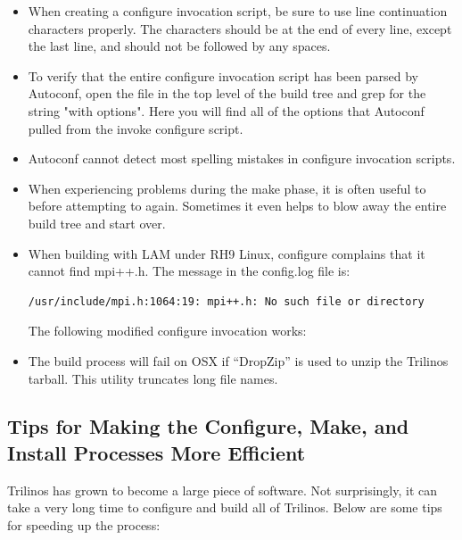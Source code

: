 \begin{itemize}
\item When creating a configure invocation script, be sure to use
line continuation characters properly.  The characters should be at the
end of every line, except the last line, and should not be followed by any
spaces.

\item To verify that the entire configure invocation script has been parsed by
Autoconf, open the  file in the top level of
the build tree and grep for the string "with options".  Here you will find all
of the options that Autoconf pulled from the invoke configure script.

\item Autoconf cannot detect most
spelling mistakes in configure invocation scripts.

\item When experiencing problems during the make phase, it is often useful to
 before attempting to  again.
Sometimes it even helps to blow away the entire build tree and start over.

\item When building with LAM under RH9 Linux, configure complains that it
cannot find mpi++.h.  The message in the config.log file is:
\begin{verbatim}
/usr/include/mpi.h:1064:19: mpi++.h: No such file or directory
\end{verbatim}
The following modified configure invocation works:

\item The build process will fail on OSX if ``DropZip'' is used to
unzip the Trilinos tarball.  This utility truncates long file names.

\end{itemize}

\subsection{Tips for Making the Configure, Make, and Install Processes More Efficient}

Trilinos has grown to become a large piece of software.  Not surprisingly,
it can take a very long time to configure and build all of Trilinos.  Below
are some tips for speeding up the process:

